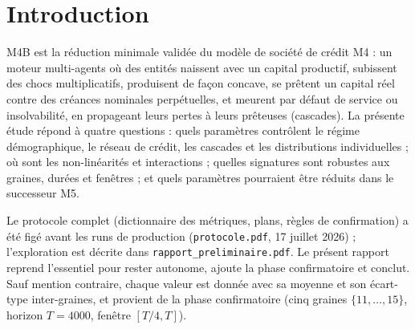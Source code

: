\documentclass[11pt,a4paper]{article}
\newcommand{\code}[1]{\texttt{#1}}
\begin{document}
\begin{abstract}
toutes les plages étudiées : M4B y est une contagion de bilan pure.
L'analyse des cycles de l'activité
agrégée (production totale) montre des phases courtes, jamais plus
longues que le hasard (durées sous la référence géométrique, maxima de
10--13 pas), une volatilité de croissance en $\lambda^{-0{,}50}$ avec
un minimum intérieur vers $\sigma\simeq0{,}1$ séparant bruit endogène
(avalanches) et exogène (chocs), une asymétrie de krach — récessions
plus courtes et plus raides, skewness toujours négative, maximale dans
le régime corrélé — vivant à l'échelle des cascades, et un temps de
mémoire de l'activité verrouillé sur la durée de vie démographique
(corrélation de rang $0{,}93$).
Sur 168 contrastes testés en
confirmation, 141 sont confirmés, 19 sont des effets nuls cohérents,
3 gardent leur signe avec une amplitude décalée et 5 ne sont pas
confirmés — tous documentés (plus 182 contrastes d'extensions
post-audit — bilans et cycles — aux bilans détaillés dans les sections
correspondantes). Nous en déduisons des
recommandations prudentes de réduction pour le successeur M5 et une
feuille de route pour son étude analytique et la future mesure d'un
effet rebond.
\end{abstract}

\tableofcontents

\section{Introduction}

M4B est la réduction minimale validée du modèle de société de crédit
M4 : un moteur multi-agents où des entités naissent avec un capital
productif, subissent des chocs multiplicatifs, produisent de façon
concave, se prêtent un capital réel contre des créances nominales
perpétuelles, et meurent par défaut de service ou insolvabilité, en
propageant leurs pertes à leurs prêteuses (cascades). La présente étude
répond à quatre questions : quels paramètres contrôlent le régime
démographique, le réseau de crédit, les cascades et les distributions
individuelles ; où sont les non-linéarités et interactions ; quelles
signatures sont robustes aux graines, durées et fenêtres ; et quels
paramètres pourraient être réduits dans le successeur M5.

Le protocole complet (dictionnaire des métriques, plans, règles de
confirmation) a été figé avant les runs de production
(\code{protocole.pdf}, 17 juillet 2026) ; l'exploration est décrite
dans \code{rapport\_preliminaire.pdf}. Le présent rapport reprend
l'essentiel pour rester autonome, ajoute la phase confirmatoire et
conclut. Sauf mention contraire, chaque valeur est donnée avec sa
moyenne et son écart-type inter-graines, et provient de la phase
confirmatoire (cinq graines $\{11,\dots,15\}$, horizon $T=4000$,
fenêtre $[T/4,T]$).
\end{document}
